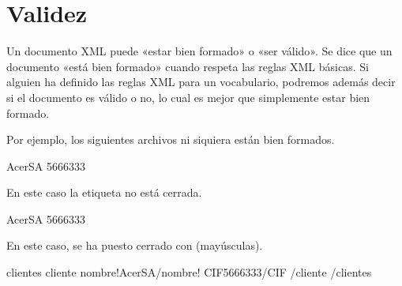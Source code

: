 \documentclass[letterpaper,10pt,spanish]{sphinxmanual}
\begin{document}
\section{Validez}
\label{\detokenize{tema5:validez}}
Un documento XML puede «estar bien formado» o «ser válido». Se dice que un documento «está bien formado» cuando respeta las reglas XML básicas. Si alguien ha definido las reglas XML para un vocabulario, podremos además decir si el documento es válido o no, lo cual es mejor que simplemente estar bien formado.

Por ejemplo, los siguientes archivos ni siquiera están bien formados.

\begin{sphinxVerbatim}[commandchars=\\\{\}]
                AcerSA
                5666333
\end{sphinxVerbatim}

En este caso la etiqueta  no está cerrada.

\begin{sphinxVerbatim}[commandchars=\\\{\}]
                AcerSA
                5666333
\end{sphinxVerbatim}

En este caso, se ha puesto  cerrado con  (mayúsculas).

\begin{sphinxVerbatim}[commandchars=\\\{\}]
\PYGZlt{}clientes\PYGZgt{}
        \PYGZlt{}cliente\PYGZgt{}
                \PYGZlt{}nombre!\PYGZgt{}AcerSA\PYGZlt{}/nombre!\PYGZgt{}
                \PYGZlt{}CIF\PYGZgt{}5666333\PYGZlt{}/CIF\PYGZgt{}
        \PYGZlt{}/cliente\PYGZgt{}
\PYGZlt{}/clientes\PYGZgt{}
\end{sphinxVerbatim}
\end{document}
